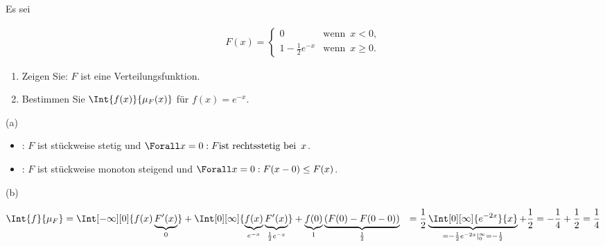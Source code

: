 
\begin{exercise}

Es sei

\begin{align*}
  F(x) =
  \begin{cases}
    0                       & \text{wenn} \enspace x < 0, \\
    1 - \frac{1}{2} e^{-x}  & \text{wenn} \enspace x \geq 0.
  \end{cases}
\end{align*}

\begin{enumerate}[label = (\alph*)]

  \item
  Zeigen Sie: $F$ ist eine Verteilungsfunktion.
  
  \item
  Bestimmen Sie $\Int{f(x)}{\mu_F(x)}$ für $f(x) = e^{-x}$.

\end{enumerate}

\end{exercise}


\begin{solution}

(a) \phantom{}

\begin{itemize}

  \item {}: $F$ ist stückweise stetig und $\Forall x = 0: F \text{ist rechtsstetig bei} \enspace x$.

  \item {}: $F$ ist stückweise monoton steigend und $\Forall x = 0: F(x - 0) \leq F(x)$.

\end{itemize}

(b)

\begin{align*}
  \Int{f}{\mu_F}
  & =
  \Int[-\infty][0]{f(x) \underbrace{F^\prime(x)}_0}
  +
  \Int[0][\infty]
  {
    \underbrace{f(x)}_{e^{-x}}
    \underbrace{F^\prime(x)}_{\frac{1}{2} e^{-x}}
  }
  +
  \underbrace{f(0)}_1 \underbrace{(F(0) - F(0 - 0))}_\frac{1}{2}
  & =
  \frac{1}{2} \underbrace
  {
    \Int[0][\infty]{e^{-2x}}{x}
  }_{
    = -\frac{1}{2} e^{-2x} |_0^\infty
    = -\frac{1}{2}
  }
  +
  \frac{1}{2}
  =
  -\frac{1}{4} + \frac{1}{2} = \frac{1}{4}
\end{align*}

\end{solution}

